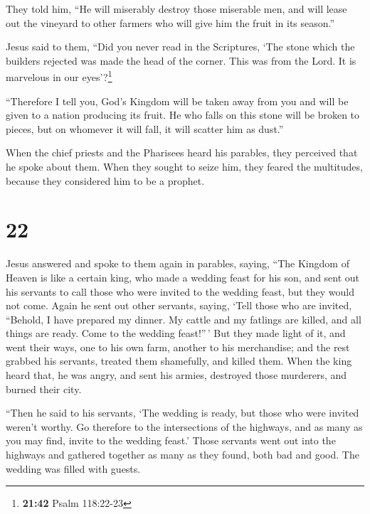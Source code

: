  They told him, ``He will miserably destroy those
miserable men, and will lease out the vineyard to other farmers who will
give him the fruit in its season.''

 Jesus said to them, ``Did you never read in the
Scriptures, `The stone which the builders rejected was made the head of
the corner. This was from the Lord. It is marvelous in our
eyes'?\footnote{\textbf{21:42} Psalm 118:22-23}

 ``Therefore I tell you, God's Kingdom will be taken away
from you and will be given to a nation producing its fruit.
 He who falls on this stone will be broken to pieces, but
on whomever it will fall, it will scatter him as dust.''

 When the chief priests and the Pharisees heard his
parables, they perceived that he spoke about them.  When
they sought to seize him, they feared the multitudes, because they
considered him to be a prophet.

\hypertarget{section-21}{%
\section{22}\label{section-21}}

 Jesus answered and spoke to them again in parables,
saying,  ``The Kingdom of Heaven is like a certain king,
who made a wedding feast for his son,  and sent out his
servants to call those who were invited to the wedding feast, but they
would not come.  Again he sent out other servants, saying,
`Tell those who are invited, ``Behold, I have prepared my dinner. My
cattle and my fatlings are killed, and all things are ready. Come to the
wedding feast!''\,'  But they made light of it, and went
their ways, one to his own farm, another to his merchandise;
 and the rest grabbed his servants, treated them
shamefully, and killed them.  When the king heard that, he
was angry, and sent his armies, destroyed those murderers, and burned
their city.

 ``Then he said to his servants, `The wedding is ready,
but those who were invited weren't worthy.  Go therefore
to the intersections of the highways, and as many as you may find,
invite to the wedding feast.'  Those servants went out
into the highways and gathered together as many as they found, both bad
and good. The wedding was filled with guests.

